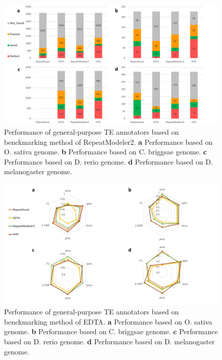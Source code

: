 \documentclass{bmcart}
\begin{document}
\begin{figure}[h!]
	\centerline{\includegraphics[width=1.0\textwidth]{figures/RM2Results.pdf}}
	\caption{Performance of general-purpose TE annotators based on benckmarking method of RepeatModeler2. \textbf{a} Performance based on O. sativa genome. \textbf{b} Performance based on C. briggsae genome. \textbf{c} Performance based on D. rerio genome. \textbf{d} Performance based on D. melanogaster genome.}
	\label{fig:rm2_results}
\end{figure}

\begin{figure}[h!]
	\centerline{\includegraphics[width=1.0\textwidth]{figures/EDTAResults.pdf}}
	\caption{Performance of general-purpose TE annotators based on benckmarking method of EDTA.  \textbf{a} Performance based on O. sativa genome. \textbf{b} Performance based on C. briggsae genome. \textbf{c} Performance based on D. rerio genome. \textbf{d} Performance based on D. melanogaster genome.}
	\label{fig:edta_results}
\end{figure}
\end{document}
